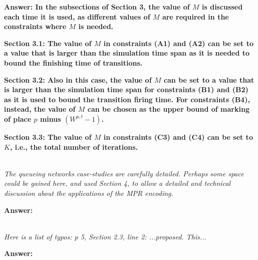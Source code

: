 \documentclass[suppldata]{interact}
\begin{document}
\noindent
\textbf{Answer: In the subsections of Section 3, the value of $M$ is discussed each time it %
is used, as different values of $M$ are required in the constraints where $M$ is needed.}

\textbf{Section 3.1: The value of $M$ in constraints (A1) and (A2) can be set to a value that is larger than the simulation time span as it is needed to bound the finishing time of transitions.}

\textbf{Section 3.2: Also in this case, the value of $M$ can be set to a value that is larger than the simulation time span for constraints (B1) and (B2) as 
it is used to bound the transition firing time. %
For constraints (B4), instead, the value of $M$ can be chosen as the upper bound of marking of place $p$ minus $(W^{p,t}-1)$.}

\textbf{Section 3.3: The value of $M$ in constraints (C3) and (C4) can be set to $K$, i.e., the total number of iterations. }

~\\


\textit{The queueing networks case-studies are carefully detailed. Perhaps
some space could be gained here, and used Section 4, to allow a
detailed and technical discussion about the applications of the MPR
encoding.}

\noindent
\textbf{Answer:}


~\\
\textit{Here is a list of typos: p 5, Section 2.3, line 2: ...proposed. This...}

\noindent
\textbf{Answer:}





\end{document}

